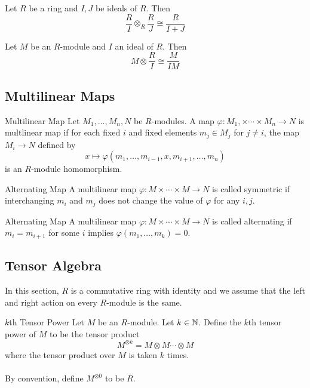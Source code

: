 \documentclass[a4paper]{article}
\begin{document}
\begin{prp}{}{} Let $R$ be a ring and $I,J$ be ideals of $R$. Then $$\frac{R}{I}\otimes_R\frac{R}{J}\cong\frac{R}{I+J}$$
\end{prp}

\begin{prp}{}{} Let $M$ be an $R$-module and $I$ an ideal of $R$. Then $$M\otimes\frac{R}{I}\cong\frac{M}{IM}$$
\end{prp}

\subsection{Multilinear Maps}
\begin{defn}{Multilinear Map}{} Let $M_1,\dots,M_n,N$ be $R$-modules. A map $\varphi:M_1,\times\cdots\times M_n\to N$ is multlinear map if for each fixed $i$ and fixed elements $m_j\in M_j$ for $j\neq i$, the map $M_i\to N$ defined by $$x\mapsto\varphi(m_1,\dots,m_{i-1},x,m_{i+1},\dots,m_n)$$ is an $R$-module homomorphism. 
\end{defn}

\begin{defn}{Alternating Map}{} A multilinear map $\varphi:M\times\cdots\times M\to N$ is called symmetric if interchanging $m_i$ and $m_j$ does not change the value of $\varphi$ for any $i,j$. 
\end{defn}

\begin{defn}{Alternating Map}{} A multilinear map $\varphi:M\times\cdots\times M\to N$ is called alternating if $m_i=m_{i+1}$ for some $i$ implies $\varphi(m_1,\dots,m_k)=0$. 
\end{defn}

\subsection{Tensor Algebra}
In this section, $R$ is a commutative ring with identity and we assume that the left and right action on every $R$-module is the same. 

\begin{defn}{$k$th Tensor Power}{} Let $M$ be an $R$-module. Let $k\in\mathbb{N}$. Define the $k$th tensor power of $M$ to be the tensor product $$M^{\otimes k}=M\otimes M\cdots\otimes M$$ where the tensor product over $M$ is taken $k$ times. \\~\\
By convention, define $M^{\otimes 0}$ to be $R$. 
\end{defn}
\end{document}
